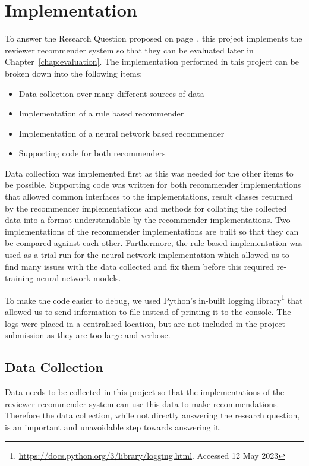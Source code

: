 \chapter{Implementation\label{chap:implementation}}

To answer the Research Question proposed on page~\pageref{section:research-question}, this project implements the reviewer recommender system so that they can be evaluated later in Chapter~\ref{chap:evaluation}. The implementation performed in this project can be broken down into the following items:
\begin{itemize}
    \item Data collection over many different sources of data
    \item Implementation of a rule based recommender
    \item Implementation of a neural network based recommender
    \item Supporting code for both recommenders
\end{itemize}

Data collection was implemented first as this was needed for the other items to be possible. Supporting code was written for both recommender implementations that allowed common interfaces to the implementations, result classes returned by the recommender implementations and methods for collating the collected data into a format understandable by the recommender implementations. Two implementations of the recommender implementations are built so that they can be compared against each other. Furthermore, the rule based implementation was used as a trial run for the neural network implementation which allowed us to find many issues with the data collected and fix them before this required re-training neural network models.

To make the code easier to debug, we used Python's in-built logging library\footnote{\url{https://docs.python.org/3/library/logging.html}. Accessed 12 May 2023} that allowed us to send information to file instead of printing it to the console. The logs were placed in a centralised location, but are not included in the project submission as they are too large and verbose.

\section{Data Collection\label{section:data-collection-implementation}}

Data needs to be collected in this project so that the implementations of the reviewer recommender system can use this data to make recommendations. Therefore the data collection, while not directly answering the research question, is an important and unavoidable step towards answering it.

